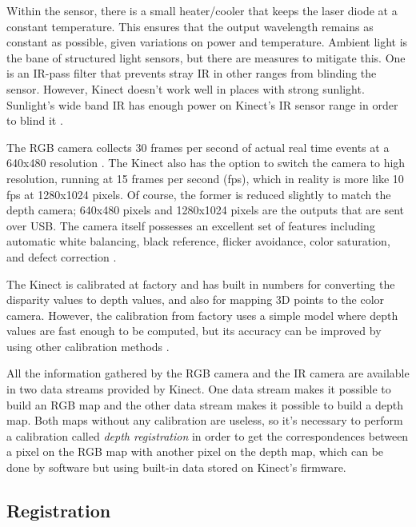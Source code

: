 \documentclass[msc, a4paper, classic, en]{ufbathesis}
\begin{document}
Within the sensor, there is a small heater/cooler that keeps the laser diode at a constant temperature. This ensures that the output wavelength remains as constant as possible, given variations on power and temperature. Ambient light is the bane of structured light sensors, but there are measures to mitigate this. One is an IR-pass filter that prevents stray IR in other ranges from blinding the sensor. However, Kinect doesn't work well in places with strong sunlight. Sunlight's wide band IR has enough power on Kinect's IR sensor range in order to blind it \cite{hackingkinect}.

The RGB camera collects 30 frames per second of actual real time events at a 640x480 resolution \cite{kinecthacks}. The Kinect also has the option to switch the camera to high resolution, running at 15 frames per second (fps), which in reality is more
like 10 fps at 1280x1024 pixels. Of course, the former is reduced slightly to match the depth camera;
640x480 pixels and 1280x1024 pixels are the outputs that are sent over USB. The camera itself possesses
an excellent set of features including automatic white balancing, black reference, flicker avoidance, color
saturation, and defect correction \cite{hackingkinect}.

The Kinect is calibrated at factory and has built in numbers for converting the disparity values to depth values, and also for mapping 3D points to the color camera. However, the calibration from factory uses a simple model where depth values are fast enough to be computed, but its accuracy can be improved by using other calibration methods \cite{magnus2013}.

All the information gathered by the RGB camera and the IR camera are available in two data streams provided by Kinect. One data stream makes it possible to build an RGB map and the other data stream makes it possible to build a depth map. Both maps without any calibration are useless, so it's necessary to perform a calibration called \textit{depth registration} in order to get the correspondences between a pixel on the RGB map with another pixel on the depth map, which can be done by software but using built-in data stored on Kinect's firmware.

\subsection{Registration}
\end{document}
